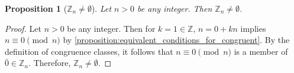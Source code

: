 \documentclass[10pt, titlepage]{amsart}
\newcommand\Z{{\mathbb Z}}
\newtheorem{prop}{Proposition}[subsection]
\theoremstyle{definition}
\begin{document}
	\begin{prop}[$\Z_n \neq \emptyset$]\label{proposition:Zn_is_nonempty}
		Let $n > 0$ be any integer. Then $\Z_n \neq \emptyset$.
	\end{prop}
	
	\begin{proof}
		Let $n > 0$ be any integer.
		Then for $k=1 \in \Z$, $n = 0 + kn$ implies $n \equiv 0 \pmod n$ by \cref{proposition:equivalent_conditions_for_congruent}.
		By the definition of congruence classes, it follows that $n \equiv 0 \pmod n$ is a member of $\bar{0} \in \Z_n$.
		Therefore, $\Z_n \neq \emptyset$.
	\end{proof}
%	
%	
%		
	
\end{document}
